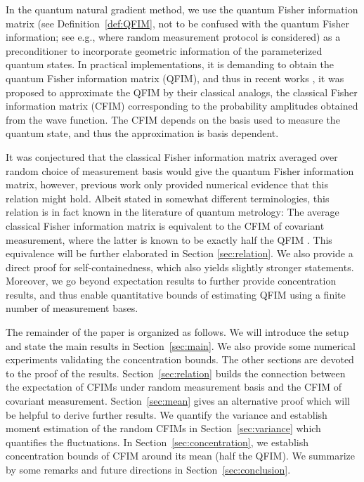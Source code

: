 \documentclass{amsart}
\theoremstyle{plain}
\theoremstyle{definition}
\theoremstyle{remark}
\begin{document}
In the quantum natural gradient method, we use the quantum Fisher information matrix (see Definition~\ref{def:QFIM}, not to be confused with the quantum Fisher information; see e.g., \cite{rath2021quantum} where random measurement protocol is considered) as a preconditioner to incorporate geometric information of the parameterized quantum states. In practical implementations, it is demanding to obtain the quantum Fisher information matrix (QFIM), and thus in recent works \cite{kolotouros2024randomnatural}, it was proposed to approximate the QFIM by their classical analogs, the classical Fisher information matrix (CFIM) corresponding to the probability amplitudes obtained from the wave function. The CFIM depends on the basis used to measure the quantum state, and thus the approximation is basis dependent. 

It was conjectured \cite{kolotouros2025accelerating} that the classical Fisher information matrix averaged over random choice of measurement basis would give the quantum Fisher information matrix, however, previous work \cite{kolotouros2024randomnatural} only provided numerical evidence that this relation might hold. {Albeit stated in somewhat different terminologies, this relation is in fact known in the literature of quantum metrology: The average classical Fisher information matrix is equivalent to the CFIM of covariant measurement, where the latter is known to be exactly half the QFIM} \cites{MasahitoHayashi_1998,PhysRevLett.120.030404}. 
{This equivalence will be further elaborated in Section} \ref{sec:relation}. {We also provide a direct proof for self-containedness, which also yields slightly stronger statements. Moreover, we go beyond expectation results to further provide concentration results, and thus enable quantitative bounds of estimating QFIM using a finite number of measurement bases.}

The remainder of the paper is organized as follows. We will introduce the setup and state the main results in Section~\ref{sec:main}. We also provide some numerical experiments validating the concentration bounds. The other sections are devoted to the proof of the results. Section~\ref{sec:relation} {builds the connection between the expectation of CFIMs under random measurement basis and the CFIM of covariant measurement.} Section~\ref{sec:mean} gives an alternative proof which will be helpful to derive further results. We quantify the variance and establish moment estimation of the random CFIMs in Section~\ref{sec:variance} which quantifies the fluctuations. In Section~\ref{sec:concentration}, we establish concentration bounds of CFIM around its mean (half the QFIM). We summarize by some remarks and future directions in Section~\ref{sec:conclusion}.
\end{document}
